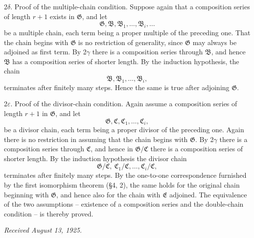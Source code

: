 \documentclass[11pt]{article}
\providecommand{\mB}{\mathfrak{B}}
\providecommand{\mC}{\mathfrak{C}}
\providecommand{\mE}{\mathfrak{E}}
\providecommand{\mG}{\mathfrak{G}}
\begin{document}
2$\delta$. Proof of the multiple-chain condition. Suppose again that a composition series of length $r+1$ exists in $\mG$, and let
\[
        \mG,\mB,\mB_1,\ldots,\mB_i,\ldots
\]
be a multiple chain, each term being a proper multiple of the preceding one. That the chain begins with $\mG$ is no restriction of generality, since $\mG$ may always be adjoined as first term. By 2$\gamma$ there is a composition series through $\mB$, and hence $\mB$ has a composition series of shorter length. By the induction hypothesis, the chain
\[
        \mB,\mB_1,\ldots,\mB_i,
\]
terminates after finitely many steps. Hence the same is true after adjoining $\mG$.

2$\varepsilon$. Proof of the divisor-chain condition. Again assume a composition series of length $r+1$ in $\mG$, and let
\[
        \mG,\mC,\mC_1,\ldots,\mC_i,
\]
be a divisor chain, each term being a proper divisor of the preceding one. Again there is no restriction in assuming that the chain begins with $\mG$. By 2$\gamma$ there is a composition series through $\mC$, and hence in $\mG/\mC$ there is a composition series of shorter length. By the induction hypothesis the divisor chain
\[
        \mG/\mC,\ \mC_1/\mC,\ldots,\mC_i/\mC,
\]
terminates after finitely many steps. By the one-to-one correspondence furnished by the first isomorphism theorem (§4, 2), the same holds for the original chain beginning with $\mG$, and hence also for the chain with $\mE$ adjoined. The equivalence of the two assumptions -- existence of a composition series and the double-chain condition -- is thereby proved.

\emph{Received August 13, 1925.}
\end{document}
